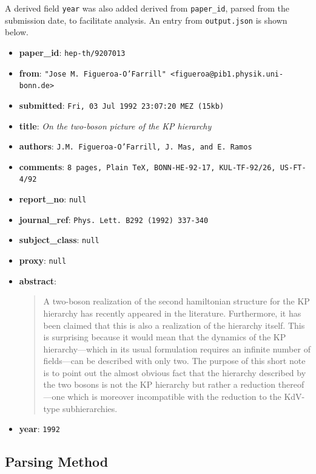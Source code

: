 \documentclass[12pt]{article}
\begin{document}
A derived field \texttt{year} was also added derived from \texttt{paper\_id}, parsed from the submission date, to facilitate analysis. An entry from \texttt{output.json} is shown below.

\begin{itemize}
  \item \textbf{paper\_id}: \texttt{hep-th/9207013}
  \item \textbf{from}: \texttt{"Jose M. Figueroa-O'Farrill" <figueroa@pib1.physik.uni-bonn.de>}
  \item \textbf{submitted}: \texttt{Fri, 03 Jul 1992 23:07:20 MEZ (15kb)}
  \item \textbf{title}: \textit{On the two-boson picture of the KP hierarchy}
  \item \textbf{authors}: \texttt{J.M. Figueroa-O'Farrill, J. Mas, and E. Ramos}
  \item \textbf{comments}: \texttt{8 pages, Plain TeX, BONN-HE-92-17, KUL-TF-92/26, US-FT-4/92}
  \item \textbf{report\_no}: \texttt{null}
  \item \textbf{journal\_ref}: \texttt{Phys. Lett. B292 (1992) 337-340}
  \item \textbf{subject\_class}: \texttt{null}
  \item \textbf{proxy}: \texttt{null}
  \item \textbf{abstract}: \smallskip

  \begin{quote}
    A two-boson realization of the second hamiltonian structure for the KP hierarchy has recently appeared in the literature. Furthermore, it has been claimed that this is also a realization of the hierarchy itself. This is surprising because it would mean that the dynamics of the KP hierarchy---which in its usual formulation requires an infinite number of fields---can be described with only two. The purpose of this short note is to point out the almost obvious fact that the hierarchy described by the two bosons is not the KP hierarchy but rather a reduction thereof---one which is moreover incompatible with the reduction to the KdV-type subhierarchies.
  \end{quote}

  \item \textbf{year}: \texttt{1992}
\end{itemize}

\subsection{Parsing Method}
\end{document}
